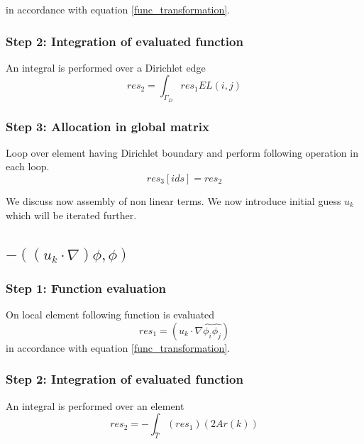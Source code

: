 \documentclass[a4paper,openany]{book}
\begin{document}
in accordance with equation \ref{func_transformation}.\\

\subsubsection{Step 2: Integration of evaluated function}

An integral is performed over a Dirichlet edge 
\begin{equation}
res_2 = \int_{\Gamma_D} res_1 EL(i,j)
\end{equation}

\subsubsection{Step 3: Allocation in global matrix}

Loop over element having Dirichlet boundary and perform following operation in each loop. 
\begin{equation}
res_3[ids] = res_2
\end{equation}

We discuss now assembly of non linear terms. We now introduce initial guess $u_k$ which will be iterated further.\\

\subsection{$-((u_k \cdot \nabla)\phi , \phi)$}

\subsubsection{Step 1: Function evaluation}

On local element following function is evaluated 
\begin{equation}
res_1 = (u_k \cdot \nabla \hat{\phi_i} \hat{\phi_j})
\end{equation} 
in accordance with equation \ref{func_transformation}.\\

\subsubsection{Step 2: Integration of evaluated function}

An integral is performed over an element 
\begin{equation}
res_2= - \int_{\hat{T}} (res_1) (2Ar(k))
\end{equation}
\end{document}
